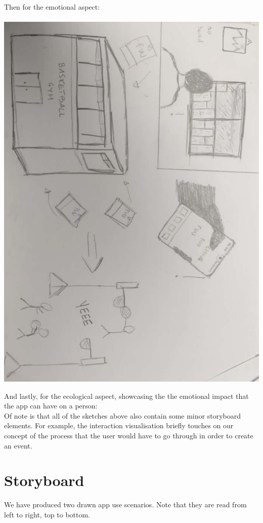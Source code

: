 \documentclass[12pt]{report}
\begin{document}
	Then for the emotional aspect:\\\\
	\includegraphics[scale=0.41]{Emotional.jpg}\break
	\newpage
	
	And lastly, for the ecological aspect, showcasing the the emotional impact that the app can have on a person:
	\\
	Of note is that all of the sketches above also contain some minor storyboard elements. For example, the interaction visualisation briefly touches on our concept of the process that the user would have to go through in order to create an event.
	\newpage
	\section*{\huge Storyboard}
	We have produced two drawn app use scenarios. Note that they are read from left to right, top to bottom.
	
	
\end{document}
